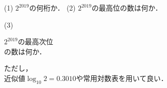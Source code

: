 \documentclass[10pt,
fleqn,
dvipdfmx,
uplatex
]{jsarticle}
\begin{document}
\small
(1)  $2^{{2019}}$の何桁か．
(2)  $2^{{2019}}$の最高位の数は何か．

(3)

\Huge
\vspace{-0.7zw}
\hspace{0.3zw}
$2^{{2019}}$の最高次位\vspace{-0.2zw}\\
\hfill の数は何か．

\small
\vspace{-1zw}
ただし，\\
\hfill 近似値$\log_{10} 2 = 0.3010$や常用対数表を用いて良い．
\end{document}
